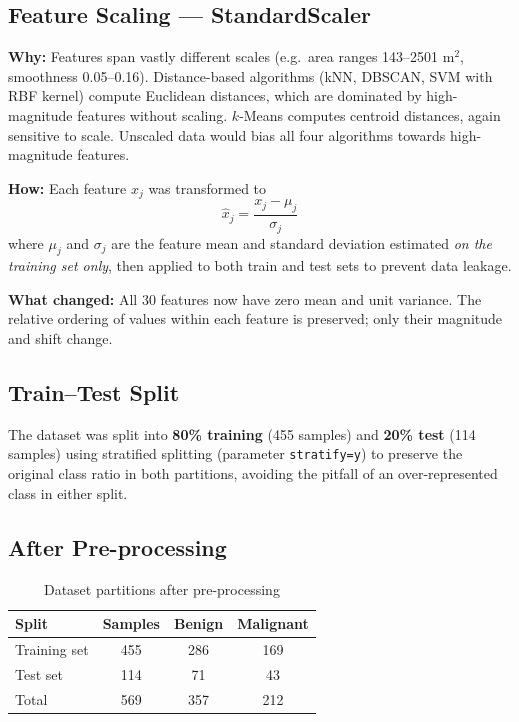 \documentclass[12pt,a4paper]{article}
\begin{document}
\subsection{Feature Scaling --- StandardScaler}
\textbf{Why:} Features span vastly different scales (e.g.\ area ranges 143--2501
\textmu m$^2$, smoothness 0.05--0.16). Distance-based algorithms (kNN, DBSCAN, SVM with
RBF kernel) compute Euclidean distances, which are dominated by high-magnitude features
without scaling. $k$-Means computes centroid distances, again sensitive to scale.
Unscaled data would bias all four algorithms towards high-magnitude features.

\textbf{How:} Each feature $x_j$ was transformed to
\[
  \hat{x}_j = \frac{x_j - \mu_j}{\sigma_j}
\]
where $\mu_j$ and $\sigma_j$ are the feature mean and standard deviation estimated
\emph{on the training set only}, then applied to both train and test sets to prevent
data leakage.

\textbf{What changed:} All 30 features now have zero mean and unit variance. The
relative ordering of values within each feature is preserved; only their magnitude
and shift change.

\subsection{Train--Test Split}
The dataset was split into \textbf{80\% training} (455 samples) and \textbf{20\% test}
(114 samples) using stratified splitting (parameter \texttt{stratify=y}) to preserve
the original class ratio in both partitions, avoiding the pitfall of an over-represented
class in either split.

\subsection{After Pre-processing}

\begin{table}[H]
  \centering
  \caption{Dataset partitions after pre-processing}
  \begin{tabular}{lccc}
    \toprule
    \textbf{Split} & \textbf{Samples} & \textbf{Benign} & \textbf{Malignant} \\
    \midrule
    Training set & 455 & 286 & 169 \\
    Test set     & 114 &  71 &  43 \\
    \midrule
    Total        & 569 & 357 & 212 \\
    \bottomrule
  \end{tabular}
\end{table}
\end{document}
